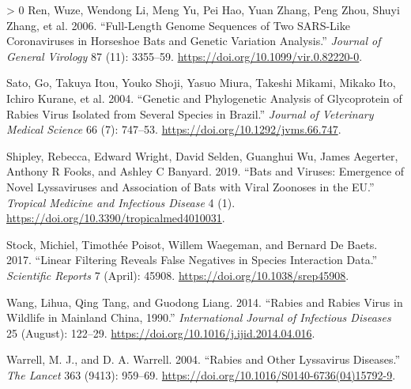 \documentclass[10pt,oneside]{article}
\newlength{\cslhangindent}
\newenvironment{CSLReferences}[3] %
 {%
  \setlength{\parindent}{0pt}
  \ifodd #1 \everypar{\setlength{\hangindent}{\cslhangindent}}\ignorespaces\fi
  \ifnum #2 > 0
  \setlength{\parskip}{#2\baselineskip}
  \fi
 }%
 {}
\begin{document}
\begin{CSLReferences}{1}{0}
\leavevmode\hypertarget{ref-Ren2006FulGen}{}%
Ren, Wuze, Wendong Li, Meng Yu, Pei Hao, Yuan Zhang, Peng Zhou, Shuyi
Zhang, et al. 2006. {``Full-Length Genome Sequences of Two SARS-Like
Coronaviruses in Horseshoe Bats and Genetic Variation Analysis.''}
\emph{Journal of General Virology} 87 (11): 3355--59.
\url{https://doi.org/10.1099/vir.0.82220-0}.

\leavevmode\hypertarget{ref-Sato2004GenPhy}{}%
Sato, Go, Takuya Itou, Youko Shoji, Yasuo Miura, Takeshi Mikami, Mikako
Ito, Ichiro Kurane, et al. 2004. {``Genetic and Phylogenetic Analysis of
Glycoprotein of Rabies Virus Isolated from Several Species in Brazil.''}
\emph{Journal of Veterinary Medical Science} 66 (7): 747--53.
\url{https://doi.org/10.1292/jvms.66.747}.

\leavevmode\hypertarget{ref-Shipley2019BatVir}{}%
Shipley, Rebecca, Edward Wright, David Selden, Guanghui Wu, James
Aegerter, Anthony R Fooks, and Ashley C Banyard. 2019. {``Bats and
Viruses: Emergence of Novel Lyssaviruses and Association of Bats with
Viral Zoonoses in the EU.''} \emph{Tropical Medicine and Infectious
Disease} 4 (1). \url{https://doi.org/10.3390/tropicalmed4010031}.

\leavevmode\hypertarget{ref-Stock2017LinFil}{}%
Stock, Michiel, Timothée Poisot, Willem Waegeman, and Bernard De Baets.
2017. {``Linear Filtering Reveals False Negatives in Species Interaction
Data.''} \emph{Scientific Reports} 7 (April): 45908.
\url{https://doi.org/10.1038/srep45908}.

\leavevmode\hypertarget{ref-Wang2014RabRab}{}%
Wang, Lihua, Qing Tang, and Guodong Liang. 2014. {``Rabies and Rabies
Virus in Wildlife in Mainland China, 1990.''} \emph{International
Journal of Infectious Diseases} 25 (August): 122--29.
\url{https://doi.org/10.1016/j.ijid.2014.04.016}.

\leavevmode\hypertarget{ref-Warrell2004RabOth}{}%
Warrell, M. J., and D. A. Warrell. 2004. {``Rabies and Other Lyssavirus
Diseases.''} \emph{The Lancet} 363 (9413): 959--69.
\url{https://doi.org/10.1016/S0140-6736(04)15792-9}.

\end{CSLReferences}
\end{document}
